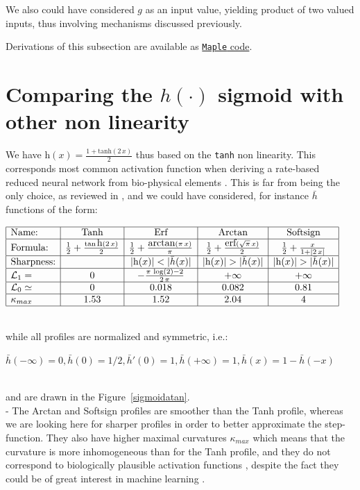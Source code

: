 \documentclass[a4]{article} \usepackage[left=2cm,right=3cm,top=1cm,bottom=2cm]{geometry}
\newcommand{\eqline}[1]{~\vspace{0.1cm}\\\centerline{$#1$}\vspace{0.1cm}\\}
\begin{document}
We also could have considered $g$ as an input value, yielding product of two valued inputs, thus involving mechanisms discussed previously.

Derivations of this subsection are available as \href{https://raw.githubusercontent.com/vthierry/braincraft/master/doc/tex/softmax.mpl.out.txt}{{\tt Maple} code}.

\section{Comparing the $h(\cdot)$ sigmoid with other non linearity}

We have $\mbox{h}(x) = \frac{1 + \mbox{tanh}(2 \, x)}{2}$ thus based on the {\tt tanh} non linearity. This corresponds most common activation function
when deriving a rate-based reduced neural network from bio-physical elements  \cite{cessac_neuron_2007}. This is far from being the only choice,
as reviewed in \cite{szandala_review_2020}, and we could have considered, for instance
$\bar{h}$ functions of the form:
\eqline{\begin{array}{|l|c|c|c|c|ll}\hline
 \mbox{Name:} &   \mbox{Tanh} & \mbox{Erf} & \mbox{Arctan} & \mbox{Softsign} \\\hline
 \mbox{Formula:} &
   \frac{1}{2} + \frac{\tan\mbox{h}(2 \, x)}{2} &
   \frac{1}{2} + \frac{\mbox{arctan}\left(\pi  \, x\right)}{\pi} &
   \frac{1}{2} + \frac{\mbox{erf}(\sqrt{\pi} \, x)}{2} &
  \frac{1}{2} + \frac{x}{1 + |2 \, x|} \\\hline
  \mbox{Sharpness:} & & |\mbox{h}(x)| < |\bar{h}(x)| & |\mbox{h}(x)| > |\bar{h}(x)| & |\mbox{h}(x)| > |\bar{h}(x)| \\\hline
  {\cal L}_1 = & 0 & -\frac{\pi  \,\log\left(2\right)-2}{2 \,\pi} & +\infty & +\infty \\\hline
  {\cal L}_0 \simeq & 0 & 0.018 & 0.082 & 0.81 \\\hline
  \kappa_{max} & 1.53 & 1.52 & 2.04 & 4 \\\hline
  \end{array}}
while all profiles are normalized and symmetric, i.e.:
\eqline{\bar{h}(-\infty) = 0, \bar{h}(0) = 1/2, \bar{h}'(0) = 1, \bar{h}(+\infty) = 1, \bar{h}(x) = 1 - \bar{h}(-x)}
and are drawn in the Figure~\ref{sigmoidatan}.
\\ - The {Arctan} and {Softsign} profiles are smoother than the Tanh profile, whereas we are looking here for sharper profiles in order to better approximate the step-function. They also have higher maximal curvatures $\kappa_{max}$ which means that the curvature is more inhomogeneous than for the Tanh profile, and they do not correspond to biologically plausible activation functions \cite{cessac_neuron_2007}, despite the fact they could be of great interest in machine learning \cite{szandala_review_2020}.
\end{document}
